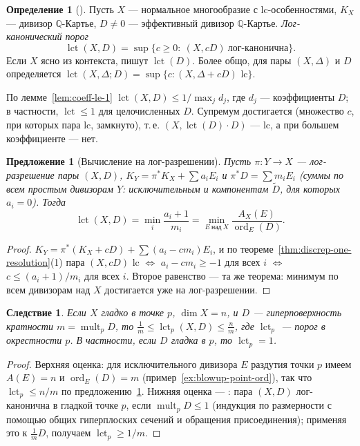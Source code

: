 \documentclass[11pt,a4paper]{article}
\theoremstyle{plain}
\newtheorem{proposition}[theorem]{Предложение}
\newtheorem{corollary}[theorem]{Следствие}
\theoremstyle{definition}
\newtheorem{definition}[theorem]{Определение}
\theoremstyle{remark}
\newcommand{\Q}{\mathbb{Q}}
\DeclareMathOperator{\ord}{ord}
\DeclareMathOperator{\lct}{lct}
\DeclareMathOperator{\mult}{mult}
\begin{document}
\begin{definition}[{\cite[8.1]{KolSing}}]\label{def:lct}
Пусть $X$ --- нормальное многообразие с lc-особенностями, $K_X$ --- дивизор $\Q$-Картье, $D\ne0$ ---
эффективный дивизор $\Q$-Картье. \emph{Лог-канонический порог}
\[
\lct(X,D)=\sup\{c\ge0:\ (X,cD)\ \text{лог-канонична}\}.
\]
Если $X$ ясно из контекста, пишут $\lct(D)$. Более общо, для пары $(X,\Delta)$ и $D$ определяется
$\lct(X,\Delta;D)=\sup\{c:(X,\Delta+cD)\text{ lc}\}$.
\end{definition}

По лемме~\ref{lem:coeff-le-1} $\lct(X,D)\le1/\max_jd_j$, где $d_j$ --- коэффициенты $D$; в
частности, $\lct\le1$ для целочисленных $D$. Супремум достигается (множество $c$, при которых пара
lc, замкнуто), т.\,е. $(X,\lct(D)\cdot D)$ --- lc, а при большем коэффициенте --- нет.

\begin{proposition}[Вычисление на лог-разрешении]\label{prop:lct-formula}
Пусть $\pi\colon Y\to X$ --- лог-разрешение пары $(X,D)$, $K_Y=\pi^*K_X+\sum a_iE_i$ и
$\pi^*D=\sum m_iE_i$ \textup{(}суммы по всем простым дивизорам $Y$: исключительным и компонентам $\tilde D$,
для которых $a_i=0$\textup{)}. Тогда
\[
\lct(X,D)=\min_i\frac{a_i+1}{m_i}=\min_{E\ \text{над}\ X}\frac{A_X(E)}{\ord_E(D)} .
\]
\end{proposition}
\begin{proof}
$K_Y=\pi^*(K_X+cD)+\sum(a_i-cm_i)E_i$, и по теореме~\ref{thm:discrep-one-resolution}(1)
пара $(X,cD)$ lc $\iff$ $a_i-cm_i\ge-1$ для всех $i$ $\iff$ $c\le(a_i+1)/m_i$ для всех $i$.
Второе равенство --- та же теорема: минимум по всем дивизорам над $X$ достигается уже на
лог-разрешении.
\end{proof}

\begin{corollary}\label{cor:lct-mult}
Если $X$ гладко в точке $p$, $\dim X=n$, и $D$ --- гиперповерхность кратности $m=\mult_pD$, то
$\frac1m\le\lct_p(X,D)\le\frac nm$, где $\lct_p$ --- порог в окрестности $p$. В частности, если
$D$ гладка в $p$, то $\lct_p=1$.
\end{corollary}
\begin{proof}
Верхняя оценка: для исключительного дивизора $E$ раздутия точки $p$ имеем $A(E)=n$ и
$\ord_E(D)=m$ (пример~\ref{ex:blowup-point-ord}), так что $\lct_p\le n/m$ по
предложению~\ref{prop:lct-formula}. Нижняя оценка --- \cite[8.10]{KolPairs}: пара $(X,D)$
лог-канонична в гладкой точке $p$, если $\mult_pD\le1$ (индукция по размерности с помощью общих
гиперплоских сечений и обращения присоединения); применяя это к $\frac1mD$, получаем $\lct_p\ge1/m$.
\end{proof}
\end{document}
